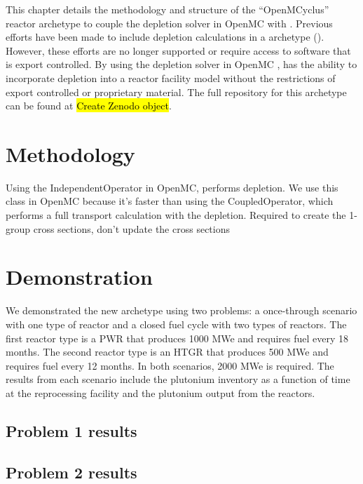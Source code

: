 This chapter details the methodology and structure of the ``OpenMCyclus'' 
reactor archetype to couple the depletion solver in OpenMC with 
\Cyclus. Previous efforts have been made to include depletion calculations 
in a \Cyclus archetype (\cite{skutnik_cyborg_2016}). However, these efforts 
are no longer supported or require access to software that is export controlled. 
By using the depletion solver in OpenMC \cite{romano_depletion_2021}, \Cyclus 
has the ability to incorporate depletion into a reactor facility model without 
the restrictions of export controlled or proprietary material. The full 
repository for this archetype can be found at \hl{Create Zenodo object}.

\section{Methodology}

Using the IndependentOperator in OpenMC, performs depletion. We use this class in 
OpenMC because it's faster than using the CoupledOperator, which performs a full 
transport calculation with the depletion. Required to create the 1-group cross 
sections, don't update the cross sections 

\section{Demonstration}
We demonstrated the new archetype using two problems: a once-through scenario with one 
type of reactor and a closed fuel cycle with two types of reactors. The first 
reactor type is a \gls{PWR} that produces 1000 MWe and requires fuel every 
18 months. The second reactor type is an \gls{HTGR} that produces 500 MWe and requires 
fuel every 12 months. In both scenarios, 2000 MWe is required. The results from each 
scenario include the plutonium inventory as a function of time at the reprocessing 
facility and the plutonium output from the reactors. 

\subsection{Problem 1 results}

\subsection{Problem 2 results}